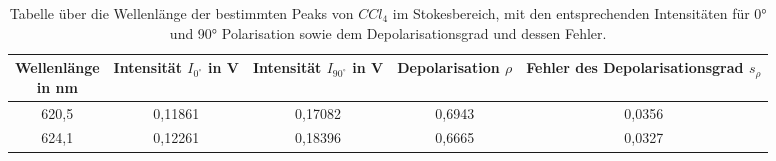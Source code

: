 \begin{table}[h]
    \centering
    \begin{tabular}{c||c|c|c|c}
      \makecell{Wellenlänge\\ in nm} & Intensität $I_{0^{\circ}}$ in V & Intensität $I_{90^{\circ}}$ in V & Depolarisation $\rho$ & \makecell{Fehler des \\ Depolarisationsgrad $s_{\rho}$} \\
      \hline
      620,5 & 0,11861 & 0,17082 & 0,6943 & 0,0356 \\
      624,1 & 0,12261 & 0,18396 & 0,6665 & 0,0327 \\  
    \end{tabular}%
    \caption{Tabelle über die Wellenlänge der bestimmten Peaks von $CCl_4$ im Stokesbereich, mit den entsprechenden Intensitäten für 0° und 90° Polarisation sowie dem Depolarisationsgrad und dessen Fehler. }
    \label{tab:ccl4}
\end{table}

